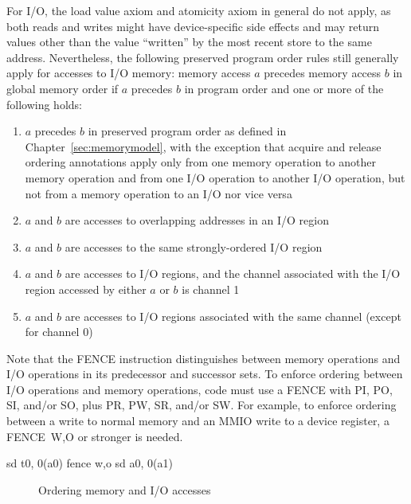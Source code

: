 For I/O, the load value axiom and atomicity axiom in general do not apply, as both reads and writes might have device-specific side effects and may return values other than the value ``written'' by the most recent store to the same address.
Nevertheless, the following preserved program order rules still generally apply for accesses to I/O memory:
memory access $a$ precedes memory access $b$ in global memory order if $a$ precedes $b$ in program order and one or more of the following holds:
\begin{enumerate}
  \item $a$ precedes $b$ in preserved program order as defined in Chapter~\ref{sec:memorymodel}, with the exception that acquire and release ordering annotations apply only from one memory operation to another memory operation and from one I/O operation to another I/O operation, but not from a memory operation to an I/O nor vice versa
  \item $a$ and $b$ are accesses to overlapping addresses in an I/O region
  \item $a$ and $b$ are accesses to the same strongly-ordered I/O region
  \item $a$ and $b$ are accesses to I/O regions, and the channel associated with the I/O region accessed by either $a$ or $b$ is channel 1
  \item $a$ and $b$ are accesses to I/O regions associated with the same channel (except for channel 0)
\end{enumerate}

Note that the FENCE instruction distinguishes between memory operations and I/O operations in its predecessor and successor sets.
To enforce ordering between I/O operations and memory operations, code must use a FENCE with PI, PO, SI, and/or SO, plus PR, PW, SR, and/or SW.
For example, to enforce ordering between a write to normal memory and an MMIO write to a device register, a FENCE~W,O or stronger is needed.

\begin{verbbox}
  sd t0, 0(a0)
  fence w,o
  sd a0, 0(a1)
\end{verbbox}
\begin{figure}[h!]
  \centering\small
  \theverbbox
  \caption{Ordering memory and I/O accesses}
  \label{fig:litmus:wo}
\end{figure}

